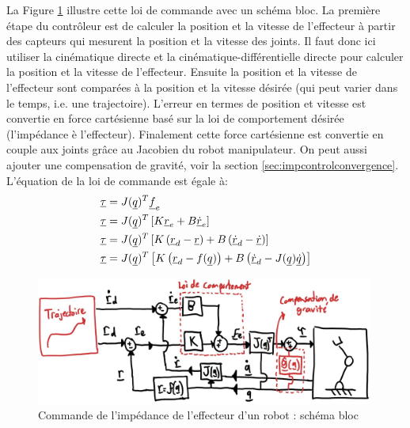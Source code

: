 La Figure \ref{fig:impedanceeffectorbloc} illustre cette loi de commande avec un schéma bloc. La première étape du contrôleur est de calculer la position et la vitesse de l'effecteur à partir des capteurs qui mesurent la position et la vitesse des joints. Il faut donc ici utiliser la cinématique directe et la cinématique-différentielle directe pour calculer la position et la vitesse de l'effecteur. Ensuite la position et la vitesse de l'effecteur sont comparées à la position et la vitesse désirée (qui peut varier dans le temps, i.e. une trajectoire). L'erreur en termes de position et vitesse est convertie en force cartésienne basé sur la loi de comportement désirée (l'impédance è l'effecteur). Finalement cette force cartésienne est convertie en couple aux joints grâce au Jacobien du robot manipulateur. On peut aussi ajouter une compensation de gravité, voir la section \ref{sec:impcontrolconvergence}. L'équation de la loi de commande est égale à:
\begin{align}
\underline{\tau} &= J(\underline{q})^T \underline{f}_e \\
\underline{\tau} &= J(\underline{q})^T   \left[ K \underline{r}_e + B \underline{\dot{r}}_e \right] \\
\underline{\tau} &= J(\underline{q})^T  \left[ K  \left( \underline{r}_d- \underline{r} \right) + B  \left( \underline{\dot{r}}_d - \underline{\dot{r}} \right)  \right] \\
\underline{\tau} &= J(\underline{q})^T  \left[ K  \left( \underline{r}_d- f(\underline{q}) \right) + B  \left( \underline{\dot{r}}_d - J(\underline{q}) \underline{\dot{q}} \right)  \right] 
\end{align}
\begin{figure}[th]
	\centering
		\includegraphics[width=0.99\textwidth]{fig/impedanceeffectorbloc.jpg}
	\caption{Commande de l'impédance de l'effecteur d'un robot : schéma bloc}
	\label{fig:impedanceeffectorbloc}
\end{figure}


